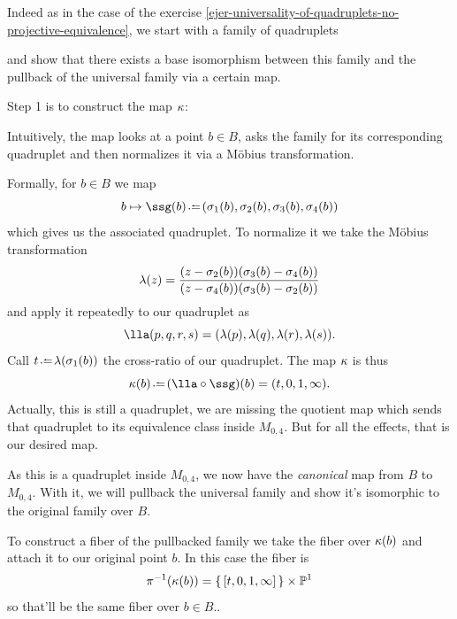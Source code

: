 \documentclass[12pt]{memoir}
\begin{document}
\begin{ptcbp}
    Indeed as in the case of the exercise \ref{ejer-universality-of-quadruplets-no-projective-equivalence}, we start with a family of quadruplets 
    \begin{center}
        \end{center}
    and show that there exists a base isomorphism between this family and the pullback of the universal family via a certain map.\par 
    Step 1 is to construct the map $\kappa$:
    \begin{center}
\end{center}

    Intuitively, the map looks at a point $b\in B$, asks the family for its corresponding quadruplet and then normalizes it via a M\"obius transformation.\par 
    Formally, for $b\in B$ we map 
    $$b\mapsto \ssg(b)\defeq (\sg_1(b),\sg_2(b),\sg_3(b),\sg_4(b))$$
    which gives us the associated quadruplet. To normalize it we take the M\"obius transformation 
    $$\lambda(z)=\frac{(z-\sigma_2(b))(\sigma_3(b)-\sigma_4(b))}{(z-\sigma_4(b))(\sigma_3(b)-\sigma_2(b))}$$
    and apply it repeatedly to our quadruplet as 
    $$\lla(p,q,r,s)=(\la(p),\la(q),\la(r),\la(s)).$$
    Call $t\defeq\la(\sg_1(b))$ the cross-ratio of our quadruplet. The map $\kappa$ is thus 
    $$\kp(b)\defeq (\lla\circ\ssg)(b)=(t,0,1,\infty).$$
    Actually, this is still a quadruplet, we are missing the quotient map which sends that quadruplet to its equivalence class inside $M_{0,4}$. But for all the effects, that is our desired map.\par 
    As this is a quadruplet inside $M_{0,4}$, we now have the \emph{canonical} map from $B$ to $M_{0,4}$. With it, we will pullback the universal family and show it's isomorphic to the original family over $B$.\par 
    To construct a fiber of the pullbacked family we take the fiber over $\kappa(b)$ and attach it to our original point $b$. In this case the fiber is 
    $$\pi^{-1}(\kappa(b))=\{\,[t,0,1,\infty]\,\}\times\mathbb{P}^1$$
    so that'll be the same fiber over $b\in B$.. 
\end{ptcbp}
\end{document}
